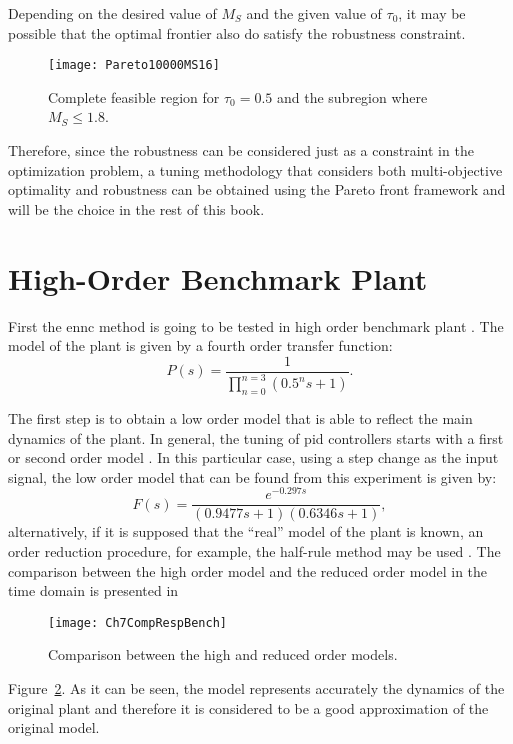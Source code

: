 Depending on the desired value of $M_S$ and the given value of $\tau_0$, it may be possible that the optimal frontier also do satisfy the robustness constraint.
%
\begin{figure}%
\centering
\texttt{[image: Pareto10000MS16]}%
\caption{Complete feasible region for $\tau_0=0.5$ and the subregion where $M_S \leq 1.8$.}%
\label{fig:Pareto10000MS16}%
\end{figure}
%
Therefore, since the robustness can be considered just as a constraint in the optimization problem, a tuning methodology that considers both multi-objective optimality and robustness can be obtained using the Pareto front framework and will be the choice in the rest of this book.
%
%
\section{High-Order Benchmark Plant}
\label{sec:Bechmark}
First the \gls{ennc} method is going to be tested in high order benchmark plant \citep{Astroem2000}. The model of the plant is given by a fourth order transfer function:
\begin{equation}
P(s) = \frac{1}{\prod_{n=0}^{n=3}(0.5^n s+1)}.
\label{eq:benchmarkTF}
\end{equation}

The first step is to obtain a low order model that is able to reflect the main dynamics of the plant. In general, the tuning of \gls{pid} controllers starts with a first or second order model \citep{Alfaro2006}. In this particular case, using a step change as the input signal, the low order model that can be found from this experiment is given by:
%
\begin{equation}
F(s)=\frac{e^{-0.297s}}{(0.9477s+1)(0.6346s+1)},
\label{eq:BenchTFfit}
\end{equation}
%
alternatively, if it is supposed that the ``real'' model of the plant is known, an order reduction procedure, for example, the half-rule method may be used \citep{Skogestad2003}. The comparison between the high order model and the reduced order model in the time domain is presented in %
\begin{figure}[tb]
	\centering
	\texttt{[image: Ch7CompRespBench]}
	\caption{Comparison between the high and reduced order models.}
	\label{fig:Ch7CompRespBench}
\end{figure}
%
Figure~\ref{fig:Ch7CompRespBench}. As it can be seen, the model represents accurately the dynamics of the original plant and therefore it is considered to be a good approximation of the original model.

